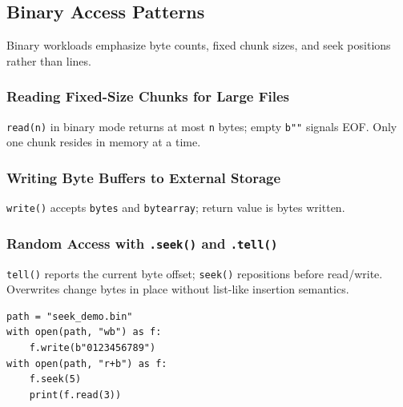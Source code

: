 \subsection{Binary Access Patterns}

Binary workloads emphasize byte counts, fixed chunk sizes, and seek positions rather than lines.

\subsubsection{Reading Fixed-Size Chunks for Large Files}

\texttt{read(n)} in binary mode returns at most \texttt{n} bytes; empty \texttt{b""} signals EOF. Only one chunk resides in memory at a time.

\subsubsection{Writing Byte Buffers to External Storage}

\texttt{write()} accepts \texttt{bytes} and \texttt{bytearray}; return value is bytes written.

\subsubsection{Random Access with \texttt{.seek()} and \texttt{.tell()}}

\texttt{tell()} reports the current byte offset; \texttt{seek()} repositions before read/write. Overwrites change bytes in place without list-like insertion semantics.

\begin{verbatim}
path = "seek_demo.bin"
with open(path, "wb") as f:
    f.write(b"0123456789")
with open(path, "r+b") as f:
    f.seek(5)
    print(f.read(3))
\end{verbatim}
